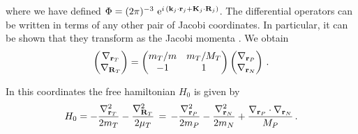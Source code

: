 where we have defined $\Phi = (2 \pi)^{-3}\ \rme^{i \,(\vect{k}_j\cdot \vect{r}_j + \vect{K}_j \cdot \vect{R}_{j})} $.
The differential operators can be written in terms of any other pair of
Jacobi coordinates. In particular, it can be shown that they transform
as the  Jacobi momenta \parencite{Fiol2002JPBp149}. We obtain
\begin{equation}\label{Q:Rel-Opp}
\left( \begin{matrix} \mathbf{\nabla}_{\mathbf{r}_{T}} \cr
\mathbf{\nabla}_{\mathbf{R}_{T}} \cr
\end{matrix}
\right) = \left(\begin{matrix}m_{T}
/ m & m_{T}/M_{T} \cr -1 & 1 \cr
\end{matrix}
\right) \left( \begin{matrix}
\mathbf{\nabla}_{\mathbf{r}_{P}} \cr
\mathbf{\nabla}_{\mathbf{r}_{N}} \cr
\end{matrix}
\right)  \, .
\end{equation}

In this coordinates the free hamiltonian $H_{0}$ is given by
\[
H_{0}=-\frac{ \nabla^{2}_{\mathbf{r}_{T}}}{2 m_{T}}
-\frac{\nabla^{2}_{\mathbf{R}_{T}}}{2 \mu_{T}} \, = \,
    -\frac{\nabla^{2}_{\mathbf{r}_{P}}}{2 m_{P}}
  -\frac{ \nabla^{2}_{\mathbf{r}_{N}}}{2 m_{N}}
  +\frac{\nabla_{\mathbf{r}_{P}} \cdot \nabla_{\mathbf{r}_{N}}}{M_{P}} \, .
\]

